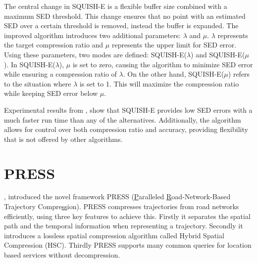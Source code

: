 The central change in SQUISH-E is a flexible buffer size combined with a maximum SED threshold. This change ensures that no point with an estimated SED over a certain threshold is removed, instead the buffer is expanded. The improved algorithm introduces two additional parameters: $\lambda$ and $\mu$. $\lambda$ represents the target compression ratio and $\mu$ represents the upper limit for SED error. Using these parameters, two modes are defined: SQUISH-E($\lambda$) and SQUISH-E($\mu$). In SQUISH-E($\lambda$), $\mu$ is set to zero, causing the algorithm to minimize SED error while ensuring a compression ratio of $\lambda$. On the other hand, SQUISH-E($\mu$) refers to the situation where $\lambda$ is set to 1. This will maximize the compression ratio while keeping SED error below $\mu$.

Experimental results from \textcite{muckell2014compression}, show that SQUISH-E provides low SED errors with a much faster run time than any of the alternatives. Additionally, the algorithm allows for control over both compression ratio and accuracy, providing flexibility that is not offered by other algorithms.

\section{PRESS}
\textcite{song2014press}, introduced the novel framework PRESS (\underline{P}aralleled \underline{R}oad-Network-Based Trajectory Compre\underline{ss}ion). PRESS compresses trajectories from road networks efficiently, using three key features to achieve this. Firstly it separates the spatial path and the temporal information when representing a trajectory. Secondly it introduces a lossless spatial compression algorithm called Hybrid Spatial Compression (HSC). Thirdly PRESS supports many common queries for location based services without decompression.


